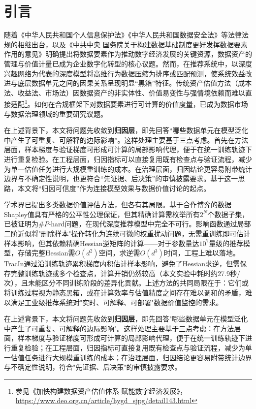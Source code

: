 \documentclass[12pt,a4paper]{ctexart}
\theoremstyle{definition}
\theoremstyle{plain}
\begin{document}
\section{引言}
\label{sec:intro}
随着《中华人民共和国个人信息保护法》《中华人民共和国数据安全法》等法律法规的相继出台，以及《中共中央 国务院关于构建数据基础制度更好发挥数据要素作用的意见》明确提出将数据要素作为推动数字经济发展的关键资源，数据资产的管理与价值计量已成为企业数字化转型的核心议题。然而，在推荐系统中，以深度兴趣网络\cite{zhou2018deep}为代表的深度模型将高维行为数据压缩为排序或匹配预测，使系统效益改进与底层数据单元之间的因果关系呈现明显“黑箱”特征。传统资产估值方法（成本法、收益法、市场法）因数据资产的非实体性、价值易变性与强情境依赖而难以直接适配\footnote{参见《加快构建数据资产估值体系 赋能数字经济发展》，\url{https://www.deo.org.cn/article/hygd_sjpg/detail143.html}}。如何在合规框架下对数据要素进行可计算的价值度量，已成为数据市场与数据治理领域的重要研究议题\cite{xu2023data}。

在上述背景下，本文将问题先收敛到\textbf{归因层}，即先回答“哪些数据单元在模型泛化中产生了可重复、可解释的边际影响”。这样处理主要基于三点考虑。首先在方法层面，样本梯度与验证梯度可形成可计算的局部影响代理，便于在统一训练轨迹下进行重复检验。在工程层面，归因指标可以直接复用既有检查点与验证流程，减少为单一估值任务进行大规模重训练的成本。在治理层面，归因结论更容易附带统计边界与不确定性说明，也更符合“先证据、后决策”的审慎披露要求。基于这一思路，本文将“归因可信度”作为连接模型效果与数据价值讨论的起点。

学术界已提出多类数据价值评估方法，但各有其局限。基于合作博弈的数据Shapley值\cite{ghorbani2019data}具有严格的公平性公理保证，但其精确计算需枚举所有$2^N$个数据子集，已被证明为$\#P$-hard问题\cite{andos2012computation}，在现代深度推荐模型中完全不可行。影响函数\cite{influence}通过局部二阶近似将"删除样本"操作转化为连续可微的权重扰动问题，无需重训练即可估计样本影响，但其依赖精确Hessian逆矩阵的计算——对于参数量达$10^7$量级的推荐模型，存储完整Hessian需$O(d^2)$空间，求逆需$O(d^3)$时间，工程上难以落地。TracIn\cite{TracIn}通过沿训练轨迹累积梯度内积估计样本影响，避免了Hessian求逆，但需保存完整训练轨迹或多个检查点，计算开销仍然较高（本文实验中耗时约27.9秒/次），且未能区分不同训练阶段的差异化贡献。上述方法的共同局限在于：它们或将训练过程视为静态黑箱，或在计算效率与估值精度之间存在难以调和的矛盾，难以满足工业级推荐系统对"实时、可解释、可部署"数据价值监控的需求。

在上述背景下，本文将问题先收敛到\textbf{归因层}，即先回答"哪些数据单元在模型泛化中产生了可重复、可解释的边际影响"。这样处理主要基于三点考虑：在方法层面，样本梯度与验证梯度可形成可计算的局部影响代理，便于在统一训练轨迹下进行重复检验；在工程层面，归因指标可直接复用既有检查点与验证流程，减少为单一估值任务进行大规模重训练的成本；在治理层面，归因结论更容易附带统计边界与不确定性说明，符合"先证据、后决策"的审慎披露要求。
\end{document}
